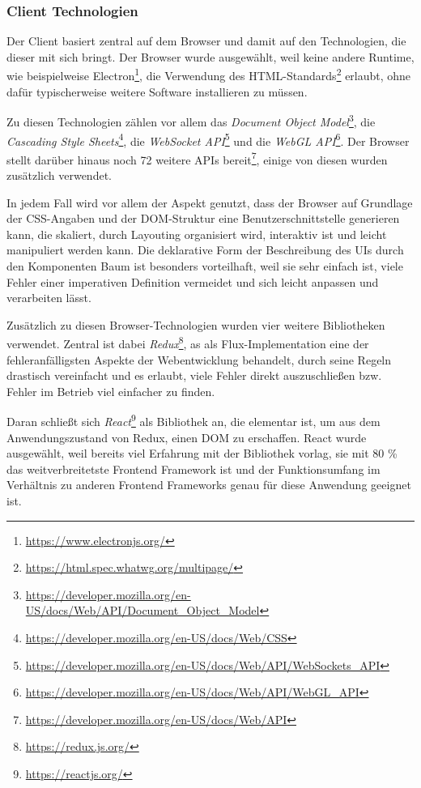 \subsubsection{Client Technologien}

Der Client basiert zentral auf dem Browser und damit auf den Technologien, die dieser mit sich bringt.
Der Browser wurde ausgewählt, weil keine andere Runtime, wie beispielweise Electron\footnote{\url{https://www.electronjs.org/}}, die Verwendung des HTML-Standards\footnote{\url{https://html.spec.whatwg.org/multipage/}} erlaubt, ohne dafür typischerweise weitere Software installieren zu müssen.

Zu diesen Technologien zählen vor allem das \textit{Document Object Model}\footnote{\url{https://developer.mozilla.org/en-US/docs/Web/API/Document_Object_Model}}, die \textit{Cascading Style Sheets}\footnote{\url{https://developer.mozilla.org/en-US/docs/Web/CSS}}, die \textit{WebSocket API}\footnote{\url{https://developer.mozilla.org/en-US/docs/Web/API/WebSockets_API}} und die \textit{WebGL API}\footnote{\url{https://developer.mozilla.org/en-US/docs/Web/API/WebGL_API}}.
Der Browser stellt darüber hinaus noch 72 weitere APIs bereit\footnote{\url{https://developer.mozilla.org/en-US/docs/Web/API}}, einige von diesen wurden zusätzlich verwendet.

In jedem Fall wird vor allem der Aspekt genutzt, dass der Browser auf Grundlage der CSS-Angaben und der DOM-Struktur eine Benutzerschnittstelle generieren kann, die skaliert, durch Layouting organisiert wird, interaktiv ist und leicht manipuliert werden kann.
Die deklarative Form der Beschreibung des UIs durch den Komponenten Baum ist besonders vorteilhaft, weil sie sehr einfach ist, viele Fehler einer imperativen Definition vermeidet und sich leicht anpassen und verarbeiten lässt.

Zusätzlich zu diesen Browser-Technologien wurden vier weitere Bibliotheken verwendet.
Zentral ist dabei \textit{Redux}\footnote{\url{https://redux.js.org/}}, as als Flux-Implementation eine der fehleranfälligsten Aspekte der Webentwicklung behandelt\autocite{flux2022}, durch seine Regeln drastisch vereinfacht und es erlaubt, viele Fehler direkt auszuschließen bzw. Fehler im Betrieb viel einfacher zu finden\autocite{garreau2018}.

Daran schließt sich \textit{React}\footnote{\url{https://reactjs.org/}} als Bibliothek an, die elementar ist, um aus dem Anwendungszustand von Redux, einen DOM zu erschaffen.
React wurde ausgewählt, weil bereits viel Erfahrung mit der Bibliothek vorlag, sie mit 80 \% das weitverbreitetste Frontend Framework ist\autocite{stateofjsfef2021} und der Funktionsumfang im Verhältnis zu anderen Frontend Frameworks genau für diese Anwendung geeignet ist.

